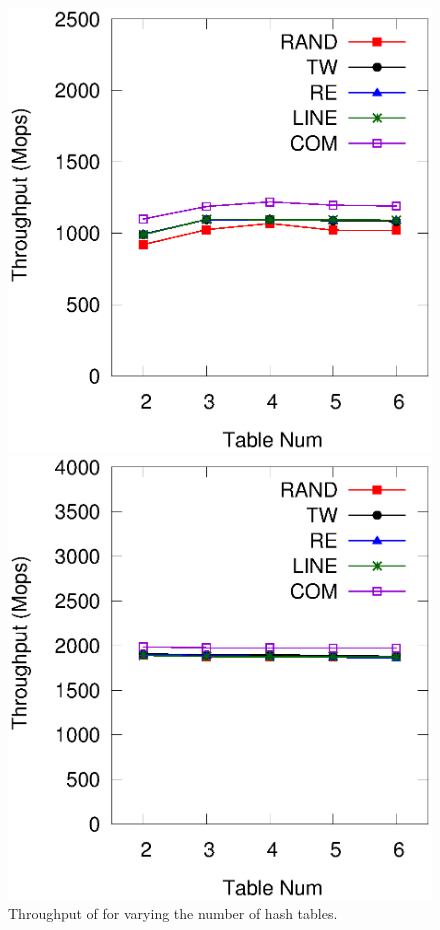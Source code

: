 \begin{figure}[t]
	\begin{minipage}{0.48\linewidth}\centering
		\includegraphics[width=\linewidth]{pic/tunning/tunning-insert.eps}
		\centerline{}
	\end{minipage}
	\begin{minipage}{0.48\linewidth}\centering
		\includegraphics[width=\linewidth]{pic/tunning/tunning-search.eps}
		\centerline{}
	\end{minipage}
	\caption{Throughput of \voter for varying the number of hash tables.}
	\label{fig:vary-table}
\end{figure}
